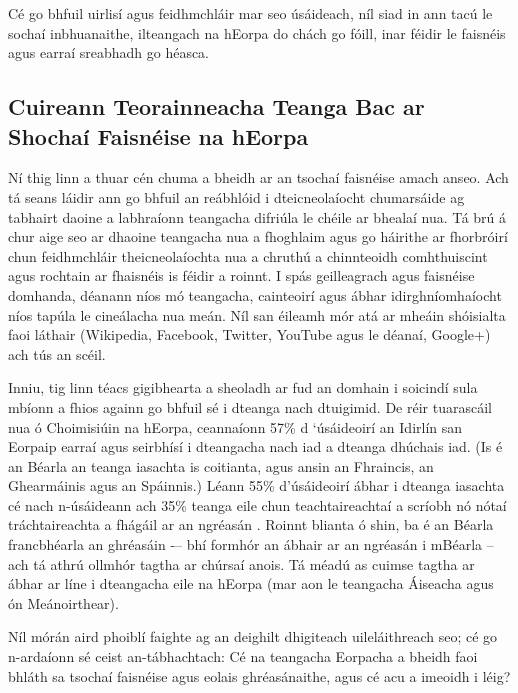 \begin{multicols}{2}
Cé go bhfuil uirlisí agus feidhmchláir mar seo úsáideach, níl siad in ann tacú le sochaí inbhuanaithe, ilteangach na hEorpa do chách go fóill, inar féidir le faisnéis agus earraí sreabhadh go héasca.

\subsection{Cuireann Teorainneacha Teanga Bac ar Shochaí Faisnéise na hEorpa}
  
Ní thig linn a thuar cén chuma a bheidh ar an tsochaí faisnéise amach anseo. Ach tá seans láidir ann go bhfuil an reábhlóid i dteicneolaíocht chumarsáide ag tabhairt daoine a labhraíonn teangacha difriúla le chéile ar bhealaí nua. Tá brú á chur aige seo ar dhaoine teangacha nua a fhoghlaim agus go háirithe ar fhorbróirí chun feidhmchláir theicneolaíochta nua a chruthú a chinnteoidh comhthuiscint agus rochtain ar fhaisnéis is féidir a roinnt. I spás geilleagrach agus faisnéise domhanda, déanann níos mó teangacha, cainteoirí agus ábhar idirghníomhaíocht níos tapúla le cineálacha nua meán. Níl san éileamh mór atá ar mheáin shóisialta faoi láthair (Wikipedia, Facebook, Twitter, YouTube agus le déanaí, Google+) ach tús an scéil.


Inniu, tig linn téacs gigibhearta a sheoladh ar fud an domhain i soicindí sula mbíonn a fhios againn go bhfuil sé i dteanga nach dtuigimid. De réir tuarascáil nua ó Choimisiúin na hEorpa, ceannaíonn 57\% d ‘úsáideoirí an Idirlín san Eorpaip earraí agus seirbhísí i dteangacha nach iad a dteanga dhúchais iad. (Is é an Béarla an teanga iasachta is coitianta, agus ansin an Fhraincis, an Ghearmáinis agus an Spáinnis.) Léann 55\% d'úsáideoirí ábhar i dteanga iasachta cé nach n-úsáideann ach 35\% teanga eile chun teachtaireachtaí a scríobh nó nótaí tráchtaireachta a fhágáil ar an ngréasán \cite{EC1}.  Roinnt blianta ó shin, ba é an Béarla francbhéarla an ghréasáin -– bhí formhór an ábhair ar an ngréasán i mBéarla – ach tá athrú ollmhór tagtha ar chúrsaí anois. Tá méadú as cuimse tagtha ar ábhar ar líne i dteangacha eile na hEorpa (mar aon le teangacha Áiseacha agus ón Meánoirthear).

Níl mórán aird phoiblí faighte ag an deighilt dhigiteach uileláithreach seo; cé go n-ardaíonn sé ceist an-tábhachtach: Cé na teangacha Eorpacha a bheidh faoi bhláth sa tsochaí faisnéise agus eolais ghréasánaithe, agus cé acu a imeoidh i léig?


\end{multicols}
